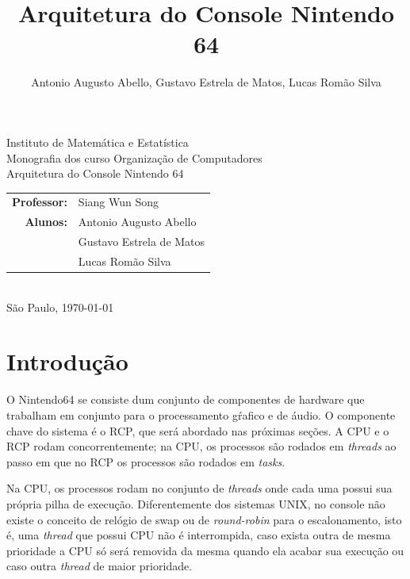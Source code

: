 \documentclass[12pt]{article}
\title{Arquitetura do Console Nintendo 64}
\author{Antonio Augusto Abello, Gustavo Estrela de Matos, Lucas Romão
Silva}
\begin{document}
\doublespacing
\begin{titlepage}
    \vfill
    \begin{center}
        \vspace{0.5\textheight}
        \noindent
        Instituto de Matemática e Estatística \\
        Monografia dos curso Organização de Computadores \\
        \vfill
        \noindent
        {\Large Arquitetura do Console Nintendo 64} \\
        \begin{tabular}{rl}
            {\bf Professor:} & {Siang Wun Song} \\
            {\bf Alunos:}    & {Antonio Augusto Abello} \\
                             & {Gustavo Estrela de Matos} \\
                             & {Lucas Romão Silva} \\
        \end{tabular} \\
        \vspace{\fill}
       \bigskip
        São Paulo, \today \\
       \bigskip
    \end{center}
\end{titlepage}

\pagebreak
\tableofcontents
\pagebreak

\section{Introdução}

O Nintendo64 se consiste dum conjunto de componentes de hardware que
trabalham em conjunto para o processamento gŕafico e de áudio. O componente
chave do sistema é o RCP, que será abordado nas próximas seções.
A CPU e o RCP rodam concorrentemente; na CPU, os processos são rodados
em \textit{threads} ao passo em que no RCP os processos são rodados em
\textit{tasks}.

Na CPU, os processos rodam no conjunto de \textit{threads} onde cada uma
possui sua própria pilha de execução. Diferentemente dos sistemas UNIX,
no console não existe o conceito de relógio de swap ou de
\textit{round-robin} para o escalonamento, isto é, uma \textit{thread}
que possui CPU não é interrompida, caso exista outra de mesma prioridade
a CPU só será removida da mesma quando ela acabar sua execução ou caso
outra \textit{thread} de maior prioridade.
\end{document}
